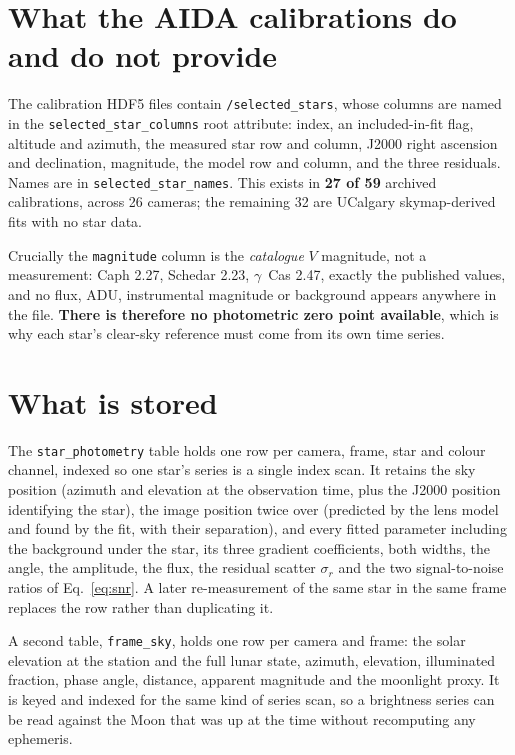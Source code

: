 \documentclass[11pt,a4paper]{article}
\begin{document}
\section{What the AIDA calibrations do and do not provide}

The calibration HDF5 files contain \texttt{/selected\_stars}, whose columns are
named in the \texttt{selected\_\allowbreak star\_\allowbreak columns} root attribute: index, an
included-in-fit flag, altitude and azimuth, the measured star row and column,
J2000 right ascension and declination, magnitude, the model row and column, and
the three residuals. Names are in \texttt{selected\_\allowbreak star\_\allowbreak names}. This exists in
\textbf{27 of 59} archived calibrations, across 26 cameras; the remaining 32 are
UCalgary skymap-derived fits with no star data.

Crucially the \texttt{magnitude} column is the \emph{catalogue} $V$ magnitude,
not a measurement: Caph \num{2.27}, Schedar \num{2.23}, $\gamma$~Cas
\num{2.47}, exactly the published values, and no flux, ADU, instrumental
magnitude or background appears anywhere in the file. \textbf{There is therefore
no photometric zero point available}, which is why each star's clear-sky
reference must come from its own time series.

\section{What is stored}

The \texttt{star\_photometry} table holds one row per camera, frame, star and
colour channel, indexed so one star's series is a single index scan. It retains
the sky position (azimuth and elevation at the observation time, plus the J2000
position identifying the star), the image position twice over (predicted by the
lens model and found by the fit, with their separation), and every fitted
parameter including the background under the star, its three gradient
coefficients, both widths, the angle, the amplitude, the flux, the residual
scatter $\sigma_r$ and the two signal-to-noise ratios of
Eq.~\eqref{eq:snr}. A later re-measurement of the same star in the same frame
replaces the row rather than duplicating it.

A second table, \texttt{frame\_sky}, holds one row per camera and frame: the
solar elevation at the station and the full lunar state, azimuth, elevation,
illuminated fraction, phase angle, distance, apparent magnitude and the
moonlight proxy. It is keyed and indexed for the same kind of series scan, so a
brightness series can be read against the Moon that was up at the time without
recomputing any ephemeris.
\end{document}
